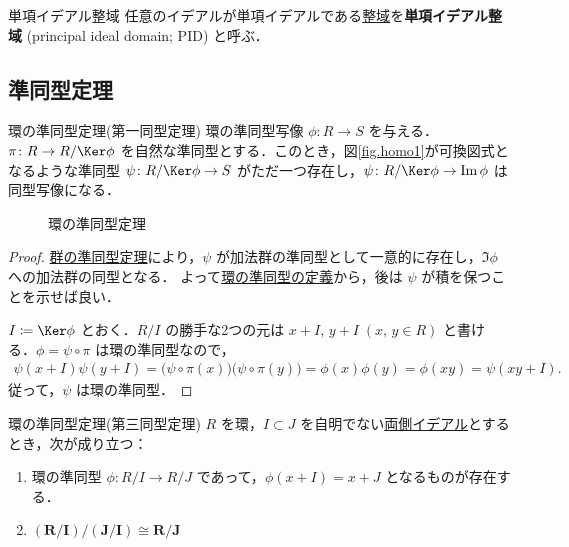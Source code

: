 \documentclass[geometry_main]{subfiles}
\begin{document}
\begin{mydef}[label=def:PID]{単項イデアル整域}
	任意のイデアルが単項イデアルである\hyperref[def:domain]{整域}を\textbf{単項イデアル整域} (principal ideal domain; PID) と呼ぶ．
\end{mydef}

\subsection{準同型定理}

\begin{mytheo}[label=thm.homo-ring1]{環の準同型定理(第一同型定理)}
	環の準同型写像 $\phi \colon R \to S$ を与える．$\pi \colon R \to R/\Ker \phi$ を自然な準同型とする．このとき，図\ref{fig.homo1}が可換図式となるような準同型 $\psi \colon R/\Ker \phi \to S$ がただ一つ存在し，$\psi \colon R/\Ker \phi \to \Im \phi$ は同型写像になる．
\end{mytheo}

\begin{figure}[H]
	\centering
	\caption{環の準同型定理}
	\label{fig.homo-ring1}
\end{figure}%

\begin{proof}
	\hyperref[thm.homo1]{群の準同型定理}により，$\psi$ が加法群の準同型として一意的に存在し，$\Im\phi$ への加法群の同型となる．
	よって\hyperref[def:homo-ring]{環の準同型の定義}から，後は $\psi$ が積を保つことを示せば良い．

	$I \coloneqq \Ker \phi$ とおく．$R/I$ の勝手な2つの元は $x+I,\, y+I\; (x,\, y \in R)$ と書ける．$\phi = \psi \circ \pi$ は環の準同型なので，
	\begin{align}
		\psi(x+I) \psi(y+I) = \bigl( \psi \circ \pi(x) \bigr) \bigl( \psi \circ \pi(y) \bigr) = \phi(x)\phi(y) = \phi(xy) = \psi(xy + I).
	\end{align}
	従って，$\psi$ は環の準同型．
\end{proof}



\begin{mytheo}[label=thm.homo-ring3]{環の準同型定理(第三同型定理)}
	$R$ を環，$I \subset J$ を自明でない\hyperref[def:ideal]{両側イデアル}とするとき，次が成り立つ：
	\begin{enumerate}
		\item 環の準同型 $\phi \colon R/I \to R/J$ であって，$\phi(x+I) = x+J$ となるものが存在する．
		\item $\bm{(R/I)/(J/I) \cong R/J}$
	\end{enumerate}
\end{mytheo}
\end{document}

